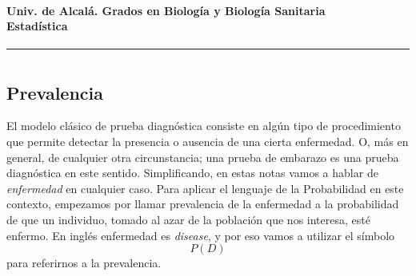 \documentclass[10pt,a4paper]{article}
\newcounter {cont01}
\begin{document}

\paragraph{Univ. de Alcal\'{a}. \hspace{2.2cm}Grados en Biología y Biología Sanitaria\\[2mm]
\hspace{9.2cm}Estadística
}
\noindent\hrule

\setcounter{section}{0}
\section*{\hspace{-0.1cm}}

\setcounter{tocdepth}{1}



\subsection*{Prevalencia}
El modelo clásico de prueba diagnóstica consiste  en algún tipo de procedimiento que permite detectar la presencia o ausencia de una cierta enfermedad. O, más en general, de cualquier otra circunstancia; una prueba de embarazo es una prueba diagnóstica en este sentido. Simplificando, en estas notas vamos a hablar de {\em enfermedad} en cualquier caso. Para aplicar el lenguaje de la Probabilidad en este contexto, empezamos por llamar {\sf prevalencia} de la enfermedad a la probabilidad de que un individuo, tomado al azar de la población que nos interesa, esté enfermo. En inglés enfermedad es {\em disease}, y por eso vamos a utilizar el símbolo
\[P(D)\]
para referirnos a la prevalencia.
\end{document}
